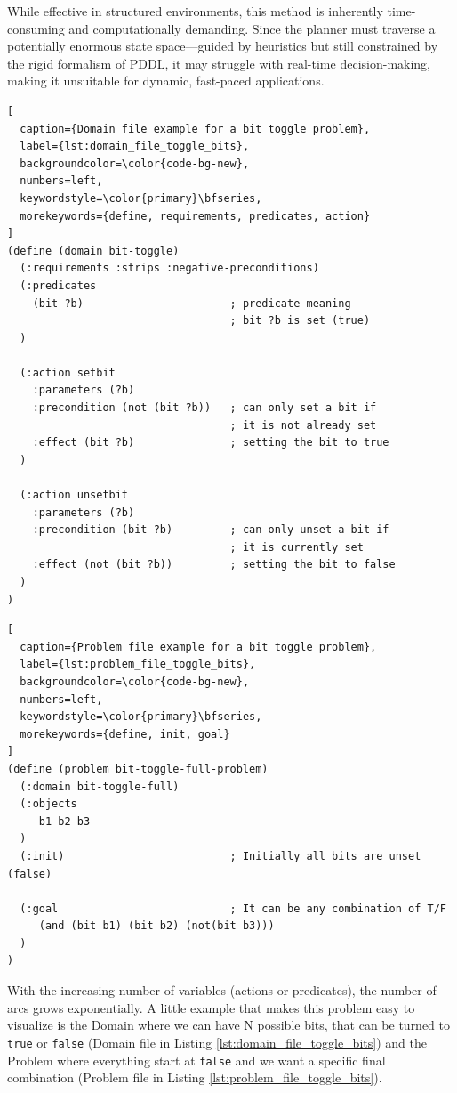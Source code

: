While effective in structured environments, this method is inherently time-consuming
and computationally demanding. Since the planner must traverse a potentially
enormous state space—guided by heuristics but still constrained by the rigid
formalism of PDDL, it may struggle with real-time decision-making, making it
unsuitable for dynamic, fast-paced applications.

\begin{lstlisting}[
  caption={Domain file example for a bit toggle problem},
  label={lst:domain_file_toggle_bits},
  backgroundcolor=\color{code-bg-new},
  numbers=left,
  keywordstyle=\color{primary}\bfseries,
  morekeywords={define, requirements, predicates, action}
]
(define (domain bit-toggle)
  (:requirements :strips :negative-preconditions)
  (:predicates
    (bit ?b)                       ; predicate meaning
                                   ; bit ?b is set (true)
  )

  (:action setbit
    :parameters (?b)
    :precondition (not (bit ?b))   ; can only set a bit if
                                   ; it is not already set
    :effect (bit ?b)               ; setting the bit to true
  )

  (:action unsetbit
    :parameters (?b)
    :precondition (bit ?b)         ; can only unset a bit if
                                   ; it is currently set
    :effect (not (bit ?b))         ; setting the bit to false
  )
)
\end{lstlisting}

\begin{lstlisting}[
  caption={Problem file example for a bit toggle problem},
  label={lst:problem_file_toggle_bits},
  backgroundcolor=\color{code-bg-new},
  numbers=left,
  keywordstyle=\color{primary}\bfseries,
  morekeywords={define, init, goal}
]
(define (problem bit-toggle-full-problem)
  (:domain bit-toggle-full)
  (:objects
     b1 b2 b3
  )
  (:init)                          ; Initially all bits are unset (false)

  (:goal                           ; It can be any combination of T/F
     (and (bit b1) (bit b2) (not(bit b3)))
  )
)
\end{lstlisting}

With the increasing number of variables (actions or predicates), the number of
arcs grows exponentially. A little example that makes this problem easy to visualize
is the Domain where we can have N possible bits, that can be turned to \texttt{true}
or \texttt{false} (Domain file in Listing \ref{lst:domain_file_toggle_bits}) and
the Problem where everything start at \texttt{false} and we want a specific final
combination (Problem file in Listing \ref{lst:problem_file_toggle_bits}).

